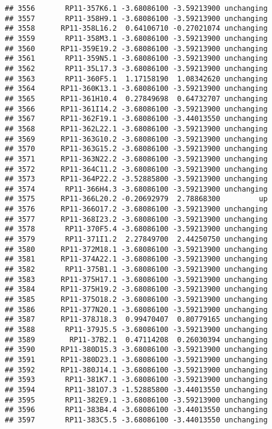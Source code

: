 \documentclass[]{article}
\begin{document}
\begin{verbatim}
## 3556       RP11-357K6.1 -3.68086100 -3.59213900 unchanging
## 3557       RP11-358H9.1 -3.68086100 -3.59213900 unchanging
## 3558      RP11-358L16.2  0.64106710 -0.27021074 unchanging
## 3559       RP11-358M3.1 -3.68086100 -3.59213900 unchanging
## 3560      RP11-359E19.2 -3.68086100 -3.59213900 unchanging
## 3561       RP11-359N5.1 -3.68086100 -3.59213900 unchanging
## 3562       RP11-35L17.3 -3.68086100 -3.59213900 unchanging
## 3563       RP11-360F5.1  1.17158190  1.08342620 unchanging
## 3564      RP11-360K13.1 -3.68086100 -3.59213900 unchanging
## 3565      RP11-361H10.4  0.27849698  0.64732707 unchanging
## 3566      RP11-361I14.2 -3.68086100 -3.59213900 unchanging
## 3567      RP11-362F19.1 -3.68086100 -3.44013550 unchanging
## 3568      RP11-362L22.1 -3.68086100 -3.59213900 unchanging
## 3569      RP11-363G10.2 -3.68086100 -3.59213900 unchanging
## 3570      RP11-363G15.2 -3.68086100 -3.59213900 unchanging
## 3571      RP11-363N22.2 -3.68086100 -3.59213900 unchanging
## 3572      RP11-364C11.2 -3.68086100 -3.59213900 unchanging
## 3573      RP11-364P22.2 -3.52885800 -3.59213900 unchanging
## 3574       RP11-366H4.3 -3.68086100 -3.59213900 unchanging
## 3575      RP11-366L20.2 -0.20692979  2.78868300         up
## 3576      RP11-366O17.2 -3.68086100 -3.59213900 unchanging
## 3577      RP11-368I23.2 -3.68086100 -3.59213900 unchanging
## 3578       RP11-370F5.4 -3.68086100 -3.59213900 unchanging
## 3579       RP11-371I1.2  2.27849700  2.44250750 unchanging
## 3580      RP11-372M18.1 -3.68086100 -3.59213900 unchanging
## 3581      RP11-374A22.1 -3.68086100 -3.59213900 unchanging
## 3582       RP11-375B1.1 -3.68086100 -3.59213900 unchanging
## 3583      RP11-375H17.1 -3.68086100 -3.59213900 unchanging
## 3584      RP11-375H19.2 -3.68086100 -3.59213900 unchanging
## 3585      RP11-375O18.2 -3.68086100 -3.59213900 unchanging
## 3586      RP11-377N20.1 -3.68086100 -3.59213900 unchanging
## 3587      RP11-378J18.3  0.99470407  0.80779165 unchanging
## 3588       RP11-379J5.5 -3.68086100 -3.59213900 unchanging
## 3589        RP11-37B2.1  0.47114208  0.26030394 unchanging
## 3590      RP11-380D15.3 -3.68086100 -3.59213900 unchanging
## 3591      RP11-380D23.1 -3.68086100 -3.59213900 unchanging
## 3592      RP11-380J14.1 -3.68086100 -3.59213900 unchanging
## 3593       RP11-381K7.1 -3.68086100 -3.59213900 unchanging
## 3594       RP11-381O7.3 -1.52885800 -3.44013550 unchanging
## 3595       RP11-382E9.1 -3.68086100 -3.59213900 unchanging
## 3596       RP11-383B4.4 -3.68086100 -3.44013550 unchanging
## 3597       RP11-383C5.5 -3.68086100 -3.44013550 unchanging

\end{verbatim}
\end{document}
